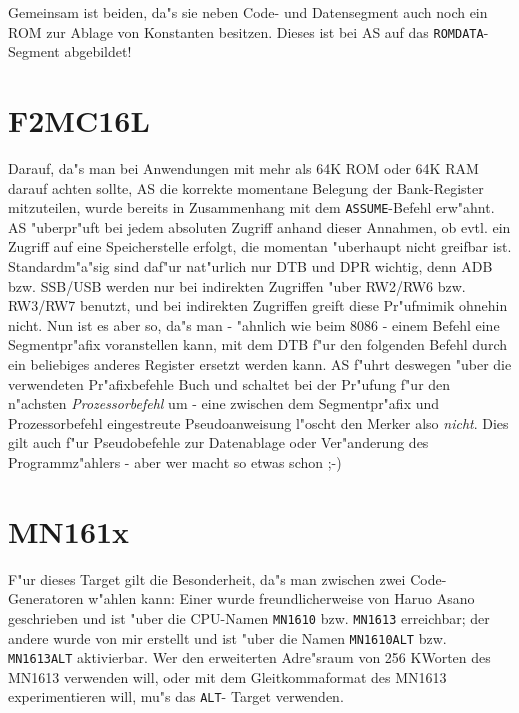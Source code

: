 \documentclass[12pt,a4paper,twoside]{report}
\newcommand{\tty}[1]{{\tt #1}}
\begin{document}
Gemeinsam ist beiden, da"s sie neben Code- und Datensegment auch noch ein
ROM zur Ablage von Konstanten besitzen.  Dieses ist bei AS auf das
\tty{ROMDATA}-Segment abgebildet!


\section{F2MC16L}

Darauf, da"s man bei Anwendungen mit mehr als 64K ROM oder 64K RAM darauf
achten sollte, AS die korrekte momentane Belegung der Bank-Register
mitzuteilen, wurde bereits in Zusammenhang mit dem {\tt ASSUME}-Befehl
erw"ahnt.  AS "uberpr"uft bei jedem absoluten Zugriff anhand dieser
Annahmen, ob evtl. ein Zugriff auf eine Speicherstelle erfolgt, die
momentan "uberhaupt nicht greifbar ist.  Standardm"a"sig sind daf"ur
nat"urlich nur DTB und DPR wichtig, denn ADB bzw. SSB/USB werden nur bei
indirekten Zugriffen "uber RW2/RW6 bzw. RW3/RW7 benutzt, und bei
indirekten Zugriffen greift diese Pr"ufmimik ohnehin nicht.  Nun ist es
aber so, da"s man - "ahnlich wie beim 8086 - einem Befehl eine
Segmentpr"afix voranstellen kann, mit dem DTB f"ur den folgenden Befehl
durch ein beliebiges anderes Register ersetzt werden kann.  AS f"uhrt
deswegen "uber die verwendeten Pr"afixbefehle Buch und schaltet bei der
Pr"ufung f"ur den n"achsten {\em Prozessorbefehl} um - eine zwischen dem
Segmentpr"afix und Prozessorbefehl eingestreute Pseudoanweisung l"oscht
den Merker also {\em nicht}.  Dies gilt auch f"ur Pseudobefehle zur
Datenablage oder Ver"anderung des Programmz"ahlers - aber wer macht so
etwas schon ;-)


\section{MN161x}

F"ur dieses Target gilt die Besonderheit, da"s man zwischen zwei
Code-Generatoren w"ahlen kann: Einer wurde freundlicherweise von Haruo Asano
geschrieben und ist "uber die CPU-Namen \tty{MN1610} bzw. \tty{MN1613}
erreichbar; der andere wurde von mir erstellt und ist "uber die Namen
\tty{MN1610ALT} bzw. \tty{MN1613ALT} aktivierbar.  Wer den erweiterten
Adre"sraum von 256 KWorten des MN1613 verwenden will, oder mit dem
Gleitkommaformat des MN1613 experimentieren will, mu"s das \tty{ALT}-
Target verwenden.
\end{document}
